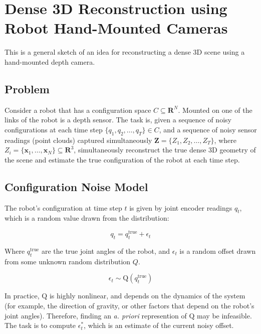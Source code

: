 \documentclass{article}
\begin{document}
\newcommand{\bx}{\mathbf{x}}
\newcommand{\ddq}{\frac{\partial}{\partial \epsilon_t}}
\newcommand{\dxdq}{\frac{\partial \bx}{\partial \epsilon_t}}
\newcommand{\argmin}{\operatornamewithlimits{argmin}}
\newcommand{\argmax}{\operatornamewithlimits{argmax}}
 \newcommand{\Prob}{\text{P}}
 \newcommand{\Z}{\textbf{Z}}
\section{Dense 3D Reconstruction using Robot Hand-Mounted Cameras}

This is a general sketch of an idea for reconstructing a dense 3D scene using a
hand-mounted depth camera.

\subsection{Problem}

Consider a robot that has a configuration space $C \subseteq \mathbf{R}^N$.
Mounted on one of the links of the robot is a depth sensor. The task is, given a
sequence of noisy configurations at each time step $\{q_1, q_2, \ldots,
q_T\} \in C$, and a sequence of noisy sensor readings (point clouds) captured
simultaneously $\Z = \{Z_1, Z_2, \ldots, Z_T\}$, where $Z_i = \{\bx_1, \ldots,
\bx_N\} \subseteq \mathbf{R}^3$,  simultaneously reconstruct the true dense 3D
geometry of the scene and estimate the true configuration of the robot at each time step.

\subsection{Configuration Noise Model} 

The robot's configuration at time step $t$ is given by joint encoder readings
$q_t$, which is a random value drawn from the distribution:

$$q_t = q_t^{\text{true}} + \epsilon_t$$

\noindent Where $q_t^{\text{true}}$ are the true joint angles of the robot,
and $\epsilon_t$ is a random offset drawn from some unknown random distribution
$Q$.

$$ \epsilon_t \sim \text{Q}(q_t^{\text{true}}) $$

In practice, $\text{Q}$ is highly nonlinear, and depends on the dynamics of the
system (for example, the direction of gravity, or other factors that depend
on the robot's joint angles). Therefore, finding an \emph{a. priori}
represention of $\text{Q}$ may be infeasible. The task is to compute $\epsilon^*_t$, which is an estimate of the
current noisy offset.
\end{document}
